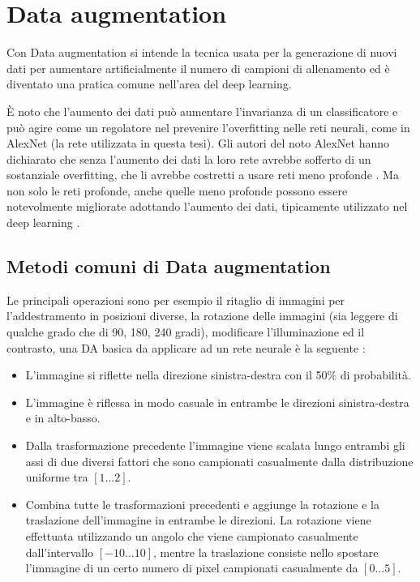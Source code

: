 \chapter{Data augmentation}\label{data-augmentation}

Con Data augmentation si intende la tecnica usata per la generazione di nuovi dati  per aumentare artificialmente il numero di campioni di allenamento ed è diventato una pratica comune nell'area del deep learning.

È noto che l'aumento dei dati può aumentare l'invarianza di un classificatore e può agire come un regolatore nel prevenire l'overfitting nelle reti neurali, come in AlexNet (la rete utilizzata in questa tesi). Gli autori del noto AlexNet  hanno dichiarato che senza l'aumento dei dati la loro rete avrebbe sofferto di un sostanziale overfitting, che li avrebbe costretti a usare reti meno profonde \cite{alexnet}. Ma non solo le reti profonde, anche quelle meno profonde  possono essere notevolmente migliorate adottando l'aumento dei dati, tipicamente utilizzato nel deep learning \cite{dataaugmentation}.


\section{Metodi comuni di Data augmentation}\label{metodi-comuni-di-data-augmentation}

Le principali operazioni sono per esempio  il ritaglio di immagini
per l'addestramento in posizioni diverse, la rotazione delle immagini (sia leggere di qualche grado che di 90, 180, 240 gradi), modificare l'illuminazione ed il contrasto, una DA basica da applicare ad un rete neurale è la seguente \cite{nanni_dct_pca}:
\begin{itemize}
    \item L'immagine si riflette nella direzione sinistra-destra con il 50\% di probabilità. 
    \item L'immagine è riflessa in modo casuale in entrambe le direzioni sinistra-destra e in alto-basso.
    \item Dalla trasformazione precedente l'immagine viene scalata lungo entrambi gli assi di due diversi fattori che sono
    campionati casualmente dalla distribuzione uniforme tra \([1...2]\).
    \item Combina tutte le trasformazioni precedenti  e aggiunge la rotazione e la traslazione dell'immagine in entrambe le
    direzioni. La rotazione viene effettuata utilizzando un angolo che viene campionato casualmente dall'intervallo
    \([-10...10]\), mentre la traslazione consiste nello spostare l'immagine di un certo numero di pixel
    campionati casualmente da \([0...5]\).
\end{itemize}

